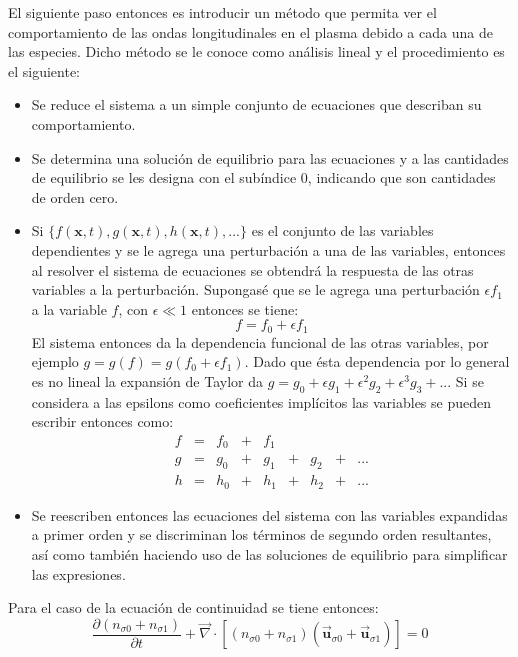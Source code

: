 \documentclass[12pt]{article}
\begin{document}
El siguiente paso entonces es introducir un método que permita ver el comportamiento de las ondas longitudinales en el  plasma debido a cada una de las especies. Dicho método se le conoce como análisis lineal y el procedimiento es el siguiente:
\begin{itemize}
\item Se reduce el sistema a un simple conjunto de ecuaciones que describan su comportamiento.
\item Se determina una solución de equilibrio para las ecuaciones y a las cantidades de equilibrio se les designa con el subíndice 0, indicando que son cantidades de orden cero.
\item Si $\lbrace f(\textbf{x},t), g(\textbf{x},t),h(\textbf{x},t),...\rbrace$ es el conjunto de las variables dependientes y se le agrega una perturbación a una de las variables, entonces al resolver el sistema de ecuaciones se obtendrá la respuesta de las otras variables a la perturbación. Supongasé que se le agrega una perturbación $\epsilon f_1$ a la variable $f$, con $\epsilon \ll 1$ entonces se tiene:
\begin{equation*}
f = f_0 + \epsilon f_1
\end{equation*}
El sistema entonces da la dependencia funcional de las otras variables, por ejemplo $g = g(f) = g(f_0 + \epsilon f_1)$. Dado que ésta dependencia por lo general es no lineal la expansión de Taylor da $g = g_0 + \epsilon g_1 + \epsilon^2 g_2 + \epsilon^3 g_3 +...$ Si se considera a las epsilons como coeficientes implícitos las variables se pueden escribir entonces como:
$$
\begin{array}{lllllllll}
f &= &f_0 &+ &f_1 \\
g &= &g_0 &+ &g_1 &+ &g_2 &+ &...\\
h &= &h_0 &+ &h_1 &+ &h_2 &+ &...
\end{array}
$$
\item Se reescriben entonces las ecuaciones del sistema con las variables expandidas a primer orden y se discriminan los términos de segundo orden resultantes, así como también haciendo uso de las soluciones de equilibrio para simplificar las expresiones.
\end{itemize}
Para el caso de la ecuación de continuidad se tiene entonces:
\begin{equation}
\frac{\partial (n_{\sigma 0} + n_{\sigma 1})}{\partial t} + \overrightarrow{\nabla} \cdot [(n_{\sigma 0}+n_{\sigma 1})(\overrightarrow{\textbf{u}}_{\sigma 0} + \overrightarrow{\textbf{u}}_{\sigma 1})]=0
\end{equation}
\end{document}

